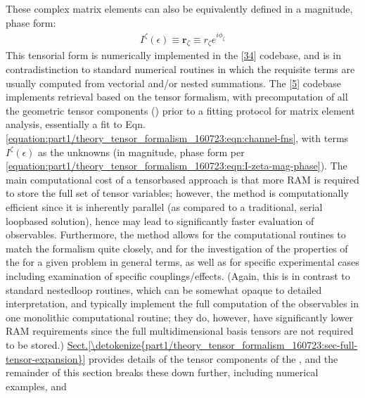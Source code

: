 \documentclass[letterpaper,table,10pt,english]{jupyterBook}
\begin{document}
\sphinxAtStartPar
These complex matrix elements can also be equivalently defined in a magnitude, phase
form:
\begin{equation}\label{equation:part1/theory_tensor_formalism_160723:eqn:I-zeta-mag-phase}
\begin{split}I^{\zeta}(\epsilon)\equiv\mathbf{r}_{\zeta}\equiv r_{\zeta}e^{i\phi_{\zeta}}\end{split}
\end{equation}
\sphinxAtStartPar
This tensorial form is numerically implemented in the  {[}\hyperlink{cite.backmatter/bibliography:id606}{34}{]} codebase, and is in contradistinction to standard numerical routines in which the requisite terms are usually computed from vectorial and/or nested summations. The  {[}\hyperlink{cite.backmatter/bibliography:id680}{5}{]} codebase implements {\hyperref[\detokenize{backmatter/glossary:term-radial-matrix-elements}]{}} retrieval based on the tensor formalism, with pre\sphinxhyphen{}computation of all the geometric tensor components ({\hyperref[\detokenize{backmatter/glossary:term-channel-functions}]{}}) prior to a fitting protocol for matrix element analysis, essentially a fit to Eqn. \eqref{equation:part1/theory_tensor_formalism_160723:eqn:channel-fns}, with terms \(I^{\zeta}(\epsilon)\) as the unknowns (in magnitude, phase form per \eqref{equation:part1/theory_tensor_formalism_160723:eqn:I-zeta-mag-phase}). The main computational cost of a tensor\sphinxhyphen{}based approach is that more RAM is required to store the full set of tensor variables; however, the method is computationally efficient since it is inherently parallel (as compared to a traditional, serial loop\sphinxhyphen{}based solution), hence may lead to significantly faster evaluation of observables. Furthermore, the method allows for the computational routines to match the formalism quite closely, and for the investigation of the properties of the {\hyperref[\detokenize{backmatter/glossary:term-channel-functions}]{}} for a given problem in general terms, as well as for specific experimental cases including examination of specific couplings/effects. (Again, this is in contrast to standard nested\sphinxhyphen{}loop routines, which can be somewhat opaque to detailed interpretation, and typically implement the full computation of the observables in one monolithic computational routine; they do, however, have significantly lower RAM requirements since the full multi\sphinxhyphen{}dimensional basis tensors are not required to be stored.) \hyperref[\detokenize{part1/theory_tensor_formalism_160723:sec-full-tensor-expansion}]{Sect.\@ \ref{\detokenize{part1/theory_tensor_formalism_160723:sec-full-tensor-expansion}}} provides details of the tensor components of the {\hyperref[\detokenize{backmatter/glossary:term-channel-functions}]{}}, and the remainder of this section breaks these down further, including numerical examples, and 
\end{document}
